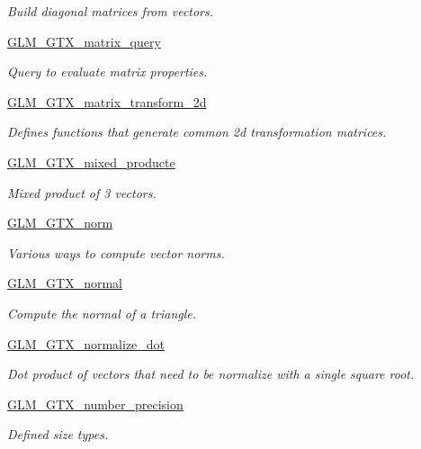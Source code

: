 \begin{DoxyCompactItemize}
\begin{DoxyCompactList}\small\item\em Build diagonal matrices from vectors. \end{DoxyCompactList}\item 
\hyperlink{group__gtx__matrix__query}{G\-L\-M\-\_\-\-G\-T\-X\-\_\-matrix\-\_\-query}
\begin{DoxyCompactList}\small\item\em Query to evaluate matrix properties. \end{DoxyCompactList}\item 
\hyperlink{group__gtx__matrix__transform__2d}{G\-L\-M\-\_\-\-G\-T\-X\-\_\-matrix\-\_\-transform\-\_\-2d}
\begin{DoxyCompactList}\small\item\em Defines functions that generate common 2d transformation matrices. \end{DoxyCompactList}\item 
\hyperlink{group__gtx__mixed__product}{G\-L\-M\-\_\-\-G\-T\-X\-\_\-mixed\-\_\-producte}
\begin{DoxyCompactList}\small\item\em Mixed product of 3 vectors. \end{DoxyCompactList}\item 
\hyperlink{group__gtx__norm}{G\-L\-M\-\_\-\-G\-T\-X\-\_\-norm}
\begin{DoxyCompactList}\small\item\em Various ways to compute vector norms. \end{DoxyCompactList}\item 
\hyperlink{group__gtx__normal}{G\-L\-M\-\_\-\-G\-T\-X\-\_\-normal}
\begin{DoxyCompactList}\small\item\em Compute the normal of a triangle. \end{DoxyCompactList}\item 
\hyperlink{group__gtx__normalize__dot}{G\-L\-M\-\_\-\-G\-T\-X\-\_\-normalize\-\_\-dot}
\begin{DoxyCompactList}\small\item\em Dot product of vectors that need to be normalize with a single square root. \end{DoxyCompactList}\item 
\hyperlink{group__gtx__number__precision}{G\-L\-M\-\_\-\-G\-T\-X\-\_\-number\-\_\-precision}
\begin{DoxyCompactList}\small\item\em Defined size types. \end{DoxyCompactList}\item 

\end{DoxyCompactItemize}

